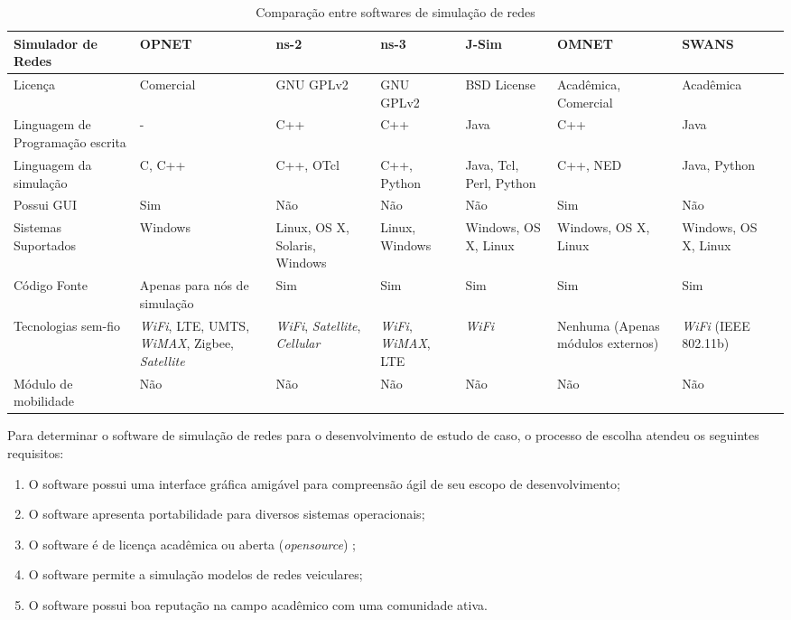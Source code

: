 \documentclass[
12pt,				%
openright,			%
oneside,			%
a4paper,			%
brazil,				%
]{abntex2}
\begin{document}
	\begin{table}[H]
		\renewcommand{\arraystretch}{1.5}
		\centering
		\begin{tabular}{|p{1.97cm}|p{1.72cm}|p{1.73cm}|p{1.66cm}|p{1.66cm}|p{1.77cm}|p{1.78cm}|p{1.77cm}|}
			\hline
			{\textbf{Simulador de Redes}} & \textbf{OPNET} & {\textbf{ns-2}} & {\textbf{ns-3}} & \textbf{J-Sim} & \textbf{OMNET} & \textbf{SWANS} \\ \hline
			Licença & Comercial & GNU GPLv2 & GNU GPLv2 & BSD License & Acadêmica, Comercial & Acadêmica \\ \hline
			Linguagem de Programação escrita & - & C++ & C++ & Java & C++ & Java \\ \hline
			Linguagem da simulação & C, C++ & C++, OTcl & C++, Python & Java, Tcl, Perl, Python & C++, NED & Java, Python \\ \hline
			Possui GUI & Sim & Não & Não & Não & Sim & Não \\ \hline
			Sistemas Suportados & Windows & Linux, OS X, Solaris, Windows & Linux, Windows & Windows, OS X, Linux & Windows, OS X, Linux & Windows, OS X, Linux \\ \hline
			Código Fonte & Apenas para nós de simulação & Sim & Sim & Sim & Sim & Sim \\ \hline
			Tecnologias sem-fio & \textit{WiFi}, LTE, UMTS, \textit{WiMAX}, Zigbee, \textit{Satellite} & \textit{WiFi}, \textit{Satellite}, \textit{Cellular} & \textit{WiFi}, \textit{WiMAX}, LTE & \textit{WiFi} & Nenhuma (Apenas módulos externos) & \textit{WiFi} (IEEE 802.11b)  \\ \hline
			Módulo de mobilidade & Não & Não & Não & Não & Não & Não \\ 
			\hline
		\end{tabular}
			\caption{Comparação entre softwares de simulação de redes}
			\label{tab_5}				
	\end{table}

	\par Para determinar o software de simulação de redes para o desenvolvimento de estudo de caso, o processo de escolha atendeu os seguintes requisitos:
	
	\begin{enumerate}
		\item O software possui uma interface gráfica amigável para compreensão ágil de seu escopo de desenvolvimento;
		\item O software apresenta portabilidade para diversos sistemas operacionais;
		\item O software é de licença acadêmica ou aberta (\textit{opensource}) ;
		\item O software permite a simulação modelos de redes veiculares;
		\item O software possui boa reputação na campo acadêmico com uma comunidade ativa.
	\end{enumerate}
	
\end{document}
